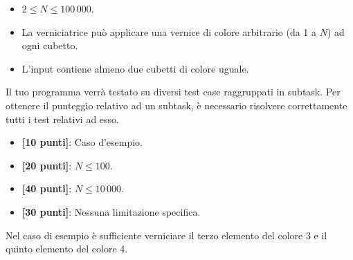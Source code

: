 \Constraints 
\begin{itemize}[nolistsep,itemsep=2mm]
  \item $2 \le N \le 100\,000$.
  \item La verniciatrice può applicare una vernice di colore arbitrario (da 1 a $N$) ad ogni cubetto.
  \item L'input contiene almeno due cubetti di colore uguale.
\end{itemize}

\Scoring
Il tuo programma verrà testato su diversi test case raggruppati in subtask.
Per ottenere il punteggio relativo ad un subtask, è necessario risolvere
correttamente tutti i test relativi ad esso.

\begin{itemize}[nolistsep,itemsep=2mm]
  \item \textbf{ [10 punti]}: Caso d'esempio.
  \item \textbf{ [20 punti]}: $N \le 100$.
  \item \textbf{ [40 punti]}: $N \le 10\,000$.
  \item \textbf{ [30 punti]}: Nessuna limitazione specifica.
\end{itemize}

\Examples
\begin{example}
%
\end{example}

\Explanation
Nel caso di esempio è sufficiente verniciare il terzo elemento del colore 3 e il quinto elemento del colore 4.